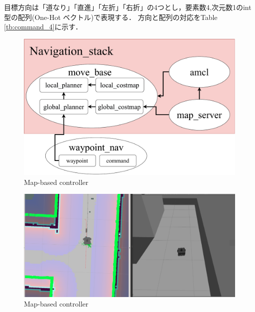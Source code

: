     目標方向は「道なり」「直進」「左折」「右折」の4つとし，要素数4,次元数1のint型の配列(One-Hot ベクトル)で表現する．
    方向と配列の対応をTable \ref{tb:command_4}に示す．
    \vspace{2.0zh}
    \begin{figure}[h]
        \centering
        \includegraphics[width = 12cm]{./figs/navigation.pdf}
        \caption{Map-based controller}
        \label{fig::navigation}
    \end{figure}

    \begin{figure}[h]
        \centering
        \includegraphics[width = 12cm]{./figs/mapbased.png}
        \caption{Map-based controller}
        \label{fig::mapbase}
    \end{figure}
    
